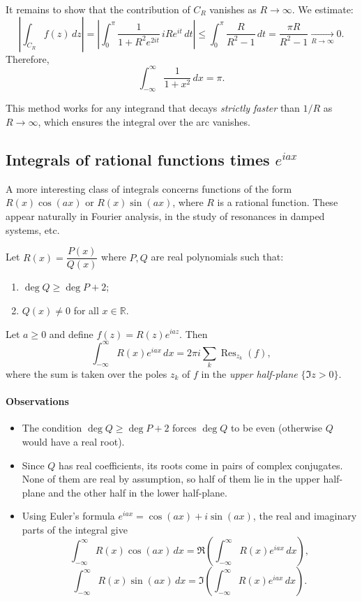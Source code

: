 It remains to show that the contribution of $C_R$ vanishes as $R\to\infty$. We estimate:
\[
\left|\int_{C_R} f(z)\,dz\right|
=\left|\int_0^\pi \frac{1}{1+R^2 e^{2it}}\,iRe^{it}\,dt\right|
\leq \int_0^\pi \frac{R}{R^2-1}\,dt
=\frac{\pi R}{R^2-1}\xrightarrow[R\to\infty]{}0.
\]
Therefore,
\[
\int_{-\infty}^\infty \frac{1}{1+x^2}\,dx = \pi.
\]

\begin{remark}
This method works for any integrand that decays \emph{strictly faster} than $1/R$ as $R\to\infty$, which ensures the integral over the arc vanishes.
\end{remark}

\subsection{Integrals of rational functions times \texorpdfstring{$e^{iax}$}{exp(iax)}}

A more interesting class of integrals concerns functions of the form $R(x)\cos(ax)$ or $R(x)\sin(ax)$, where $R$ is a rational function. These appear naturally in Fourier analysis, in the study of resonances in damped systems, etc.

\begin{theorem}
Let $R(x)=\dfrac{P(x)}{Q(x)}$ where $P,Q$ are real polynomials such that:
\begin{enumerate}
\item $\deg Q \geq \deg P + 2$;
\item $Q(x)\neq 0$ for all $x\in\mathbb{R}$.
\end{enumerate}
Let $a\geq 0$ and define $f(z)=R(z)e^{iaz}$. Then
\[
\int_{-\infty}^{\infty} R(x)e^{iax}\,dx
=2\pi i \sum_{k} \operatorname{Res}_{z_k}(f),
\]
where the sum is taken over the poles $z_k$ of $f$ in the \emph{upper half-plane} $\{\Im z>0\}$.
\end{theorem}

\paragraph{Observations}
\begin{itemize}
\item The condition $\deg Q\geq \deg P+2$ forces $\deg Q$ to be even (otherwise $Q$ would have a real root).
\item Since $Q$ has real coefficients, its roots come in pairs of complex conjugates. None of them are real by assumption, so half of them lie in the upper half-plane and the other half in the lower half-plane.
\item Using Euler's formula $e^{iax}=\cos(ax)+i\sin(ax)$, the real and imaginary parts of the integral give
\[
\int_{-\infty}^\infty R(x)\cos(ax)\,dx = \Re\!\left(\int_{-\infty}^\infty R(x)e^{iax}\,dx\right),
\]
\[
\int_{-\infty}^\infty R(x)\sin(ax)\,dx = \Im\!\left(\int_{-\infty}^\infty R(x)e^{iax}\,dx\right).
\]
\end{itemize}

